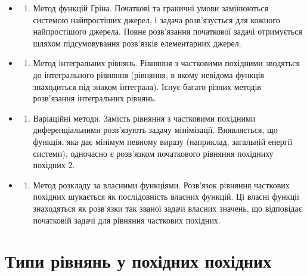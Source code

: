 \documentclass[
  ukrainian,
]{article}
\providecommand{\tightlist}{%
  \setlength{\itemsep}{0pt}\setlength{\parskip}{0pt}}
\begin{document}
\begin{itemize}
\tightlist
\item
  \begin{enumerate}
  \def\labelenumi{\arabic{enumi}.}
  \setcounter{enumi}{6}
  \tightlist
  \item
    Метод функцій Гріна. Початкові та граничні умови замінюються
    системою найпростіших джерел, і задача розв'язується для кожного
    найпростішого джерела. Повне розв'язання початкової задачі
    отримується шляхом підсумовування розв'язків елементарних джерел.
  \end{enumerate}
\item
  \begin{enumerate}
  \def\labelenumi{\arabic{enumi}.}
  \setcounter{enumi}{7}
  \tightlist
  \item
    Метод інтегральних рівнянь. Рівняння з частковими похідними
    зводяться до інтегрального рівняння (рівняння, в якому невідома
    функція знаходиться під знаком інтеграла). Існує багато різних
    методів розв'язання інтегральних рівнянь.
  \end{enumerate}
\item
  \begin{enumerate}
  \def\labelenumi{\arabic{enumi}.}
  \setcounter{enumi}{8}
  \tightlist
  \item
    Варіаційні методи. Замість рівняння з частковими похідними
    диференціальними розв'язують задачу мінімізації. Виявляється, що
    функція, яка дає мінімум певному виразу (наприклад, загальній
    енергії системи), одночасно є розв'язком початкового рівняння
    похідниху похідних 2.
  \end{enumerate}
\item
  \begin{enumerate}
  \def\labelenumi{\arabic{enumi}.}
  \setcounter{enumi}{9}
  \tightlist
  \item
    Метод розкладу за власними функціями. Розв'язок рівняння часткових
    похідних шукається як послідовність власних функцій. Ці власні
    функції знаходяться як розв'язки так званої задачі власних значень,
    що відповідає початковій задачі для рівняння часткових похідних.
  \end{enumerate}
\end{itemize}

\section{Типи рівнянь у похідних
похідних}\label{ux442ux438ux43fux438-ux440ux456ux432ux43dux44fux43dux44c-ux443-ux43fux43eux445ux456ux434ux43dux438ux445-ux43fux43eux445ux456ux434ux43dux438ux445}
\end{document}
